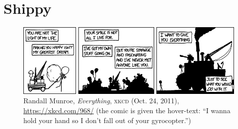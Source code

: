 \documentclass[../FGP.tex]{subfiles}
\begin{document}
\section{Shippy}
\relax
\begin{figure}
  \includegraphics[width=\textwidth]{../lib/everything}
  \caption{Randall Munroe, \textit{Everything}, \textsc{xkcd} (Oct. 24, 2011), \url{https://xkcd.com/968/} (the comic is given the hover-text: ``I wanna hold your hand so I don't fall out of your gyrocopter.'')}
\end{figure}
\end{document}
